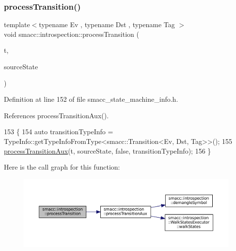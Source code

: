 \subsubsection{\texorpdfstring{process\+Transition()}{processTransition()}\hspace{0.1cm}{\footnotesize\ttfamily [2/4]}}
{\footnotesize\ttfamily template$<$typename Ev , typename Dst , typename Tag $>$ \\
void smacc\+::introspection\+::process\+Transition (\begin{DoxyParamCaption}\item[{\hyperlink{classsmacc_1_1Transition}{smacc\+::\+Transition}$<$ Ev, Dst, Tag $>$ $\ast$}]{t,  }\item[{std\+::shared\+\_\+ptr$<$ \hyperlink{classsmacc_1_1introspection_1_1SmaccStateInfo}{Smacc\+State\+Info} $>$ \&}]{source\+State }\end{DoxyParamCaption})}



Definition at line 152 of file smacc\+\_\+state\+\_\+machine\+\_\+info.\+h.



References process\+Transition\+Aux().


\begin{DoxyCode}
153 \{
154     \textcolor{keyword}{auto} transitionTypeInfo = TypeInfo::getTypeInfoFromType<smacc::Transition<Ev, Dst, Tag>>();
155     \hyperlink{namespacesmacc_1_1introspection_a208cd71dc5579090d40b3d3b9efb28a6}{processTransitionAux}(t, sourceState, \textcolor{keyword}{false}, transitionTypeInfo);
156 \}
\end{DoxyCode}
Here is the call graph for this function\+:
\nopagebreak
\begin{figure}[H]
\begin{center}
\leavevmode
\includegraphics[width=350pt]{namespacesmacc_1_1introspection_a4f5403936b7b501da0c6fa9f067e09fd_cgraph}
\end{center}
\end{figure}
\mbox{\label{namespacesmacc_1_1introspection_a1083a0c41469be69ec8317eb7e95d3f0}} 
